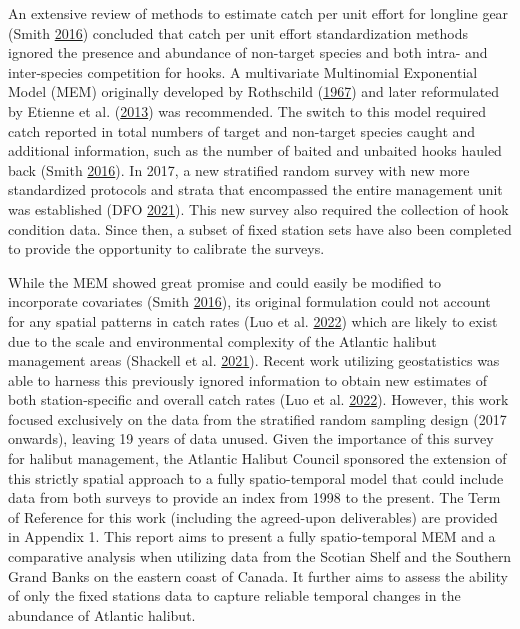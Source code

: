 \documentclass[12pt]{article}\usepackage[]{graphicx}\usepackage[]{color}
\begin{document}
An extensive review of methods to estimate catch per unit effort for longline gear (Smith \protect\hyperlink{ref-Smith2016a}{2016}) concluded that catch per unit effort standardization methods ignored the presence and abundance of non-target species and both intra- and inter-species competition for hooks. A multivariate Multinomial Exponential Model (MEM) originally developed by Rothschild (\protect\hyperlink{ref-Rothschild1967}{1967}) and later reformulated by Etienne et al. (\protect\hyperlink{ref-Etienne2013}{2013}) was recommended. The switch to this model required catch reported in total numbers of target and non-target species caught and additional information, such as the number of baited and unbaited hooks hauled back (Smith \protect\hyperlink{ref-Smith2016a}{2016}). In 2017, a new stratified random survey with new more standardized protocols and strata that encompassed the entire management unit was established (DFO \protect\hyperlink{ref-DFO2021}{2021}). This new survey also required the collection of hook condition data. Since then, a subset of fixed station sets have also been completed to provide the opportunity to calibrate the surveys.

While the MEM showed great promise and could easily be modified to incorporate covariates (Smith \protect\hyperlink{ref-Smith2016a}{2016}), its original formulation could not account for any spatial patterns in catch rates (Luo et al. \protect\hyperlink{ref-Luo2022}{2022}) which are likely to exist due to the scale and environmental complexity of the Atlantic halibut management areas (Shackell et al. \protect\hyperlink{ref-Shackell2021}{2021}). Recent work utilizing geostatistics was able to harness this previously ignored information to obtain new estimates of both station-specific and overall catch rates (Luo et al. \protect\hyperlink{ref-Luo2022}{2022}). However, this work focused exclusively on the data from the stratified random sampling design (2017 onwards), leaving 19 years of data unused. Given the importance of this survey for halibut management, the Atlantic Halibut Council sponsored the extension of this strictly spatial approach to a fully spatio-temporal model that could include data from both surveys to provide an index from 1998 to the present. The Term of Reference for this work (including the agreed-upon deliverables) are provided in Appendix 1. This report aims to present a fully spatio-temporal MEM and a comparative analysis when utilizing data from the Scotian Shelf and the Southern Grand Banks on the eastern coast of Canada. It further aims to assess the ability of only the fixed stations data to capture reliable temporal changes in the abundance of Atlantic halibut.
\end{document}
